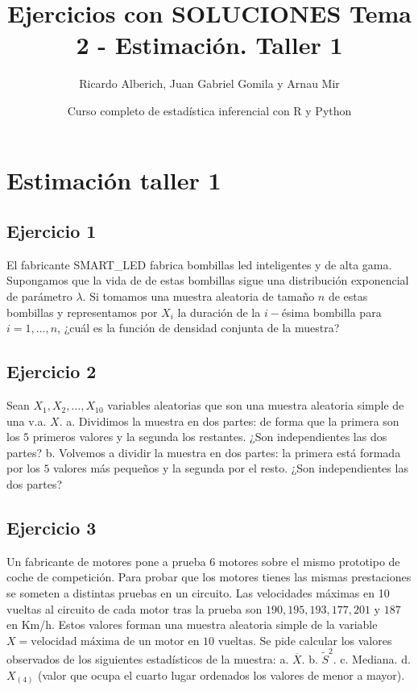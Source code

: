 \documentclass[]{article}
\title{Ejercicios con SOLUCIONES Tema 2 - Estimación. Taller 1}
\author{Ricardo Alberich, Juan Gabriel Gomila y Arnau Mir}
\date{Curso completo de estadística inferencial con R y Python}
\begin{document}
\maketitle

{
\hypersetup{linkcolor=blue}
\setcounter{tocdepth}{2}
\tableofcontents
}
\hypertarget{estimaciuxf3n-taller-1}{%
\section{Estimación taller 1}\label{estimaciuxf3n-taller-1}}

\hypertarget{ejercicio-1}{%
\subsection{Ejercicio 1}\label{ejercicio-1}}

El fabricante SMART\_LED fabrica bombillas led inteligentes y de alta
gama. Supongamos que la vida de de estas bombillas sigue una
distribución exponencial de parámetro \(\lambda\). Si tomamos una
muestra aleatoria de tamaño \(n\) de estas bombillas y representamos por
\(X_i\) la duración de la \(i-\)ésima bombilla para \(i=1,\ldots,n\),
¿cuál es la función de densidad conjunta de la muestra?

\hypertarget{ejercicio-2}{%
\subsection{Ejercicio 2}\label{ejercicio-2}}

Sean \(X_1,X_2,\ldots,X_{10}\) variables aleatorias que son una muestra
aleatoria simple de una v.a. \(X\). a. Dividimos la muestra en dos
partes: de forma que la primera son los \(5\) primeros valores y la
segunda los restantes. ¿Son independientes las dos partes? b. Volvemos a
dividir la muestra en dos partes: la primera está formada por los \(5\)
valores más pequeños y la segunda por el resto. ¿Son independientes las
dos partes?

\hypertarget{ejercicio-3}{%
\subsection{Ejercicio 3}\label{ejercicio-3}}

Un fabricante de motores pone a prueba \(6\) motores sobre el mismo
prototipo de coche de competición. Para probar que los motores tienes
las mismas prestaciones se someten a distintas pruebas en un circuito.
Las velocidades máximas en 10 vueltas al circuito de cada motor tras la
prueba son \(190,195,193,177,201\) y \(187\) en Km/h. Estos valores
forman una muestra aleatoria simple de la variable
\(X=\mbox{velocidad máxima de un motor en 10 vueltas.}\) Se pide
calcular los valores observados de los siguientes estadísticos de la
muestra: a. \(\overline{X}\). b. \(\tilde{S}^2\). c. Mediana. d.
\(X_{(4)}\) (valor que ocupa el cuarto lugar ordenados los valores de
menor a mayor).
\end{document}
